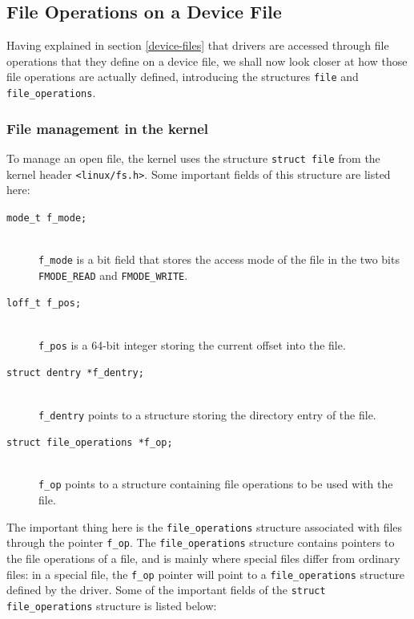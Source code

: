 \subsection{File Operations on a Device File}
Having explained in section \ref{device-files} that drivers are accessed through file operations that they define on a device file, we shall now look closer at how those file operations are actually defined, introducing the structures \texttt{file} and \texttt{file\_operations}.

\subsubsection{File management in the kernel}
To manage an open file, the kernel uses the structure \texttt{struct file} from the kernel header \texttt{<linux/fs.h>}. Some important fields of this structure are listed here:
\begin{description}
  \item[\texttt{mode\_t f\_mode;}] \hfill \\
    \texttt{f\_mode} is a bit field that stores the access mode of the file in the two bits \texttt{FMODE\_READ} and \texttt{FMODE\_WRITE}.
  \item[\texttt{loff\_t f\_pos;}] \hfill \\
    \texttt{f\_pos} is a 64-bit integer storing the current offset into the file.
  \item[\texttt{struct dentry *f\_dentry;}] \hfill \\
    \texttt{f\_dentry} points to a structure storing the directory entry of the file.   
  \item[\texttt{struct file\_operations *f\_op;}] \hfill \\
    \texttt{f\_op} points to a structure containing file operations to be used with the file.
\end{description}
The important thing here is the \texttt{file\_operations} structure associated with files through the pointer \texttt{f\_op}. The \texttt{file\_operations} structure contains pointers to the file operations of a file, and is mainly where special files differ from ordinary files: in a special file, the \texttt{f\_op} pointer will point to a \texttt{file\_operations} structure defined by the driver. Some of the important fields of the \texttt{struct file\_operations} structure is listed below:
